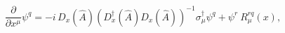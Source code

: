 \begin{equation}\label{modederivative}
\frac{\partial}{\partial x^\mu}\psi^q=- i\,
D_x(\hat A)\left(
D_x^\dagger(\hat A)
D_x(\hat A)\right)^{-1}\sigma_\mu^\dagger\psi^q+
\psi^r~R_\mu^{rq}(x),\end{equation}

